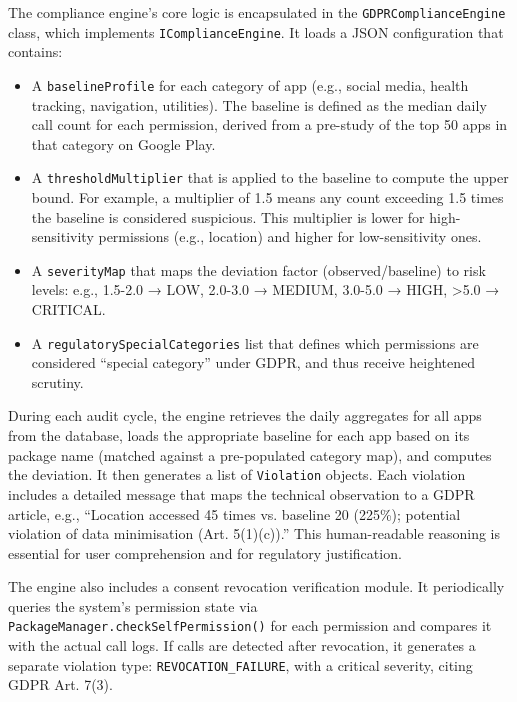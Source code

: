 The compliance engine's core logic is encapsulated in the \texttt{GDPRComplianceEngine} class, which implements \texttt{IComplianceEngine}. It loads a JSON configuration that contains:

\begin{itemize}
\item A \texttt{baselineProfile} for each category of app (e.g., social media, health tracking, navigation, utilities). The baseline is defined as the median daily call count for each permission, derived from a pre-study of the top 50 apps in that category on Google Play.
\item A \texttt{thresholdMultiplier} that is applied to the baseline to compute the upper bound. For example, a multiplier of 1.5 means any count exceeding 1.5 times the baseline is considered suspicious. This multiplier is lower for high-sensitivity permissions (e.g., location) and higher for low-sensitivity ones.
\item A \texttt{severityMap} that maps the deviation factor (observed/baseline) to risk levels: e.g., 1.5-2.0 → LOW, 2.0-3.0 → MEDIUM, 3.0-5.0 → HIGH, >5.0 → CRITICAL.
\item A \texttt{regulatorySpecialCategories} list that defines which permissions are considered ``special category'' under GDPR, and thus receive heightened scrutiny.
\end{itemize}

During each audit cycle, the engine retrieves the daily aggregates for all apps from the database, loads the appropriate baseline for each app based on its package name (matched against a pre-populated category map), and computes the deviation. It then generates a list of \texttt{Violation} objects. Each violation includes a detailed message that maps the technical observation to a GDPR article, e.g., ``Location accessed 45 times vs. baseline 20 (225\%); potential violation of data minimisation (Art. 5(1)(c)).'' This human-readable reasoning is essential for user comprehension and for regulatory justification.

The engine also includes a consent revocation verification module. It periodically queries the system's permission state via \texttt{PackageManager.checkSelfPermission()} for each permission and compares it with the actual call logs. If calls are detected after revocation, it generates a separate violation type: \texttt{REVOCATION\_FAILURE}, with a critical severity, citing GDPR Art. 7(3).

